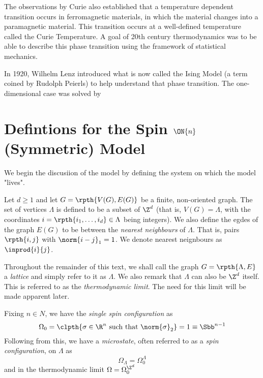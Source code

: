 	The observations by Curie also established that a temperature dependent transition occurs in 
	ferromagnetic materials, in which the material changes into a paramagnetic material. This transition 
	occurs at a well-defined temperature called the Curie Temperature. A goal of 20th century 
	thermodynamics was to be able to describe this phase transition using the framework of statistical 
	mechanics. 

	In 1920, Wilhelm Lenz introduced what is now called the Ising Model (a term coined by Rudolph 
	Peierls) to help understand that phase transition. The one-dimensional case was solved by 

	\section{Defintions for the Spin \texorpdfstring{$\ON{n}$}{O(n)} (Symmetric) Model}
		We begin the discusiion of the model by defining the system on which the model "lives". 

	\begin{ndefi}
		Let $d \geq 1$ and let $G = \rpth{V(G), E(G)}$ be a finite, non-oriented graph. The set of 
		vertices $\Lambda$ is defined to be a subset of $\Z^d$ (that is, $V(G) = \Lambda$, with 
		the coordinates $i = \rpth{i_1, \dots ,i_d} \in \Lambda $ being integers). We also 
		define the egdes of the graph $E(G)$ to be between the \textit{nearest neighbours} of $\Lambda$. 
		That is, pairs $\rpth{i,j}$ with $\norm{i-j}_1 = 1$. We denote nearest neignbours as 
		$\inprod{i}{j}$. 
	\end{ndefi}

	Throughout the remainder of this text, we shall call the graph $G = \rpth{\Lambda, E}$ a 
	\textit{lattice} and simply refer to it as $\Lambda$. We also remark that $\Lambda$ can also 
	be $\Z^d$ itself. This is referred to as the \textit{thermodynamic limit}. The need for this limit 
	will be made apparent later.

	Fixing $n \in N$, we have the \textit{single spin configuration} as 
	\[ \Omega_0 = \clpth{\sigma \in \R^n \ \mathrm{such \ that} \ \norm{\sigma}_2} = 1 \equiv \Sbb^{n-1}\]
	Following from this, we have a \textit{microstate}, often referred to as a 
	\textit{spin configuration}, on $\Lambda$ as 
 	\[ \Omega_{\Lambda} =  \Omega_0^{\Lambda} \]
	and in the thermodynamic limit $\Omega = \Omega_0^{\Z^d}$
	 
